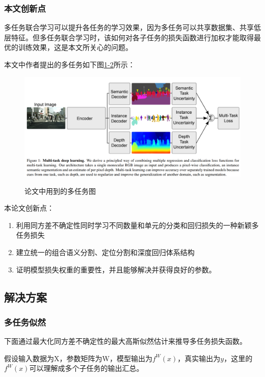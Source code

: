 \subsubsection{本文创新点}

多任务联合学习可以提升各任务的学习效果，因为多任务可以共享数据集、共享低层特征。但多任务联合学习时，该如何对各子任务的损失函数进行加权才能取得最优的训练效果，这是本文所关心的问题。

本文中作者提出的多任务如下图\href{fig:1-2}{1-2}所示：
\begin{figure}
  \centering
  \includegraphics[width=5.5in]{figure/example/1.png}\\
  \caption{论文中用到的多任务图}
  \label{fig:1-2}
\end{figure}

本论文创新点：
\begin{enumerate}
    \item 利用同方差不确定性同时学习不同数量和单元的分类和回归损失的一种新颖多任务损失
    \item 建立统一的组合语义分割、定位分割和深度回归体系结构
    \item 证明模型损失权重的重要性，并且能够解决并获得良好的参数。
\end{enumerate}

\subsection{解决方案}

\subsubsection{多任务似然}
下面通过最大化同方差不确定性的最大高斯似然估计来推导多任务损失函数。

假设输入数据为X，参数矩阵为W，模型输出为$f^W(x)$，真实输出为$y$，这里的$f^W(x)$可以理解成多个子任务的输出汇总。

